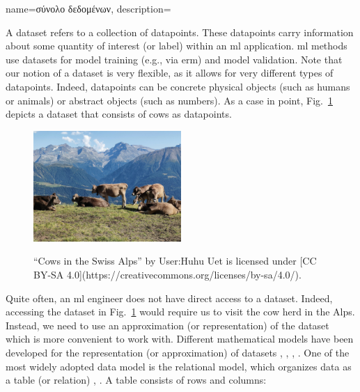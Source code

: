 {name={\foreignlanguage{greek}{σύνολο δεδομένων}},
	description={A dataset refers to a collection of \gls{datapoint}s. These 
		\gls{datapoint}s carry information about some quantity of interest (or \gls{label}) within 
		an \gls{ml} application. \gls{ml} methods use datasets for \gls{model} training (e.g., via \gls{erm})
		and \gls{model} \gls{validation}. Note that our notion of a dataset is very flexible, as 
		it allows for very different types of \gls{datapoint}s. Indeed, \gls{datapoint}s can be concrete 
		physical objects (such as humans or animals) or abstract objects (such as numbers). 
		As a case in point, Fig.\ \ref{fig_cows_dataset} depicts a dataset that consists of cows as 
		\gls{datapoint}s. 
		\begin{figure}[H]
				\begin{center}
		\label{fig:cowsintheswissalps}
		\includegraphics[width=0.5\textwidth]{assets/Cows_in_the_Swiss_Alps.jpg}
		  \end{center}
		\caption{\label{fig_cows_dataset}“Cows in the Swiss Alps” by User:Huhu Uet is licensed under [CC BY-SA 4.0](https://creativecommons.org/licenses/by-sa/4.0/).}
	  \end{figure}
       Quite often, an \gls{ml} engineer does not have direct access to a dataset. Indeed, accessing the 
       dataset in Fig.\ \ref{fig_cows_dataset} would require us to visit the cow herd in the Alps. Instead, 
       we need to use an approximation (or representation) of the dataset which is more convenient 
       to work with. Different mathematical \gls{model}s have been developed for the representation (or approximation) 
       of datasets \cite{silberschatz2019database}, \cite{abiteboul1995foundations}, \cite{hoberman2009data}, \cite{ramakrishnan2002database}. 
       One of the most widely adopted data \gls{model} is the relational \gls{model}, which organizes \gls{data} 
       as a table (or relation) \cite{codd1970relational}, \cite{silberschatz2019database}.
		A table consists of rows and columns:
}}
